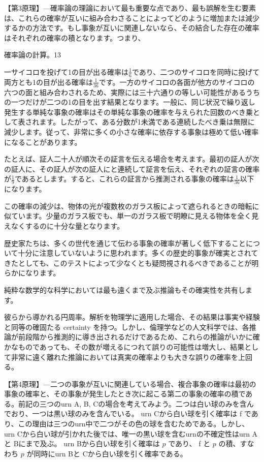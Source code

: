 \documentclass[a4paper,11pt,openany]{ltjsbook}
\begin{document}
【第3原理】—確率論の理論において最も重要な点であり、最も誤解を生む要素は、これらの確率が互いに組み合わさることによってどのように増加または減少するかの方法です。もし事象が互いに関連しないなら、その結合した存在の確率はそれぞれの確率の積となります。つまり、

確率論の計算。13

一サイコロを投げて1の目が出る確率は$\frac{1}{6}$であり、二つのサイコロを同時に投げて両方とも1の目が出る確率は$\frac{1}{36}$です。一方のサイコロの各面が他方のサイコロの六つの面と組み合わされるため、実際には三十六通りの等しい可能性があるうちの一つだけが二つの1の目を出す結果となります。一般に、同じ状況で繰り返し発生する単純な事象の確率はその単純な事象の確率を与えられた回数のべき乗として表されます。したがって、ある分数が1未満である連続したべき乗は無限に減少します。従って、非常に多くの小さな確率に依存する事象は極めて低い確率になることがあります。

たとえば、証人二十人が順次その証言を伝える場合を考えます。最初の証人が次の証人に、その証人が次の証人にと連続して証言を伝え、それぞれの証言の確率が$\frac{1}{9}$であるとします。すると、これらの証言から推測される事象の確率は$\frac{1}{36}$以下になります。

この確率の減少は、物体の光が複数枚のガラス板によって遮られるときの暗転に似ています。少量のガラス板でも、単一のガラス板で明瞭に見える物体を全く見えなくするのに十分な量となります。

歴史家たちは、多くの世代を通じて伝わる事象の確率が著しく低下することについて十分に注意していないように思われます。多くの歴史的事象が確実とされてきたとしても、このテストによって少なくとも疑問視されるべきであることが明らかになります。

純粋な数学的な科学においては最も遠くまで及ぶ推論もその確実性を共有します。

彼らから導かれる円周率。解析を物理学に適用した場合、その結果は事実や経験と同等の確固たる certainty を持つ。しかし、倫理学などの人文科学では、各推論が前段階から推測的に導き出されるだけであるため、これらの推論がいかに確かなものであっても、その数が増えるにつれて誤りの可能性は増大し、結果として非常に遠く離れた推論においては真実の確率よりも大きな誤りの確率を上回る。

【第4原理】—二つの事象が互いに関連している場合、複合事象の確率は最初の事象の確率と、その事象が発生したとき次に起こる第二の事象の確率の積である。前記の三つのurn A, B, Cの場合を考えてみよう。二つは白い球のみを含んでおり、一つは黒い球のみを含んでいる。 urn Cから白い球を引く確率は f であり、この理由は三つのurn中で二つがその色の球を含むためである。しかし、 urn Cから白い球が引かれた後では、唯一の黒い球を含むurnの不確定性はurn Aと Bにまで及ぶ。 urn Bから白い球を引く確率は $p$ であり、 f と $p$ の積、すなわち $p$ が同時にurn Bと Cから白い球を引く確率である。
\end{document}
